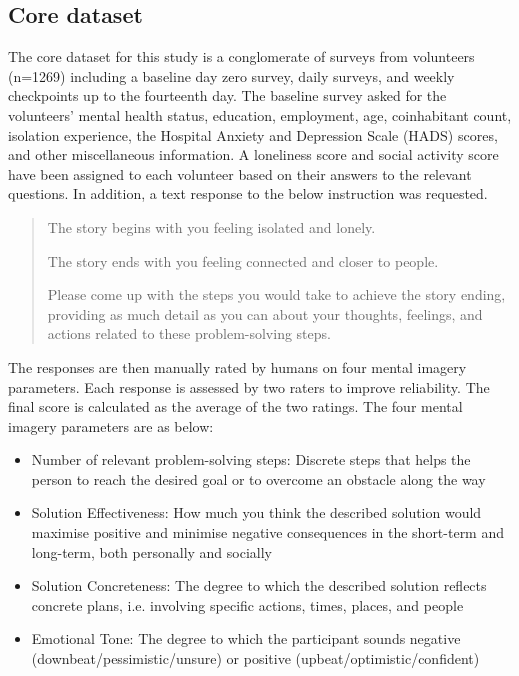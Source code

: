\documentclass[12pt, a4paper]{article}
\begin{document}
\subsection{Core dataset}
The core dataset for this study is a conglomerate of surveys from volunteers (n=1269) including a baseline day zero survey, daily surveys, and weekly checkpoints up to the fourteenth day. The baseline survey asked for the volunteers' mental health status, education, employment, age, coinhabitant count, isolation experience, the Hospital Anxiety and Depression Scale (HADS) scores, and other miscellaneous information. A loneliness score and social activity score have been assigned to each volunteer based on their answers to the relevant questions. In addition, a text response to the below instruction was requested. 

\begin{quote}
The story begins with you feeling isolated and lonely.

The story ends with you feeling connected and closer to people.

Please come up with the steps you would take to achieve the story ending, providing as much detail as you can about your thoughts, feelings, and actions related to these problem-solving steps.
\end{quote}

The responses are then manually rated by humans on four mental imagery parameters. Each response is assessed by two raters to improve reliability. The final score is calculated as the average of the two ratings. The four mental imagery parameters are as below:

\begin{itemize}
  \item Number of relevant problem-solving steps: Discrete steps that helps the person to reach the desired goal or to overcome an obstacle along the way
  \item Solution Effectiveness: How much you think the described solution would maximise positive and minimise negative consequences in the short-term and long-term, both personally and socially
  \item Solution Concreteness: The degree to which the described solution reflects concrete plans, i.e. involving specific actions, times, places, and people
  \item Emotional Tone: The degree to which the participant sounds negative (downbeat/pessimistic/unsure) or positive (upbeat/optimistic/confident)
\end{itemize}
\end{document}
